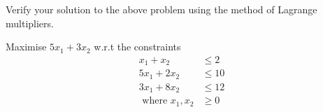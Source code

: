\documentclass[journal,12pt,twocolumn]{IEEEtran}
\begin{document}
\begin{problem}
	Verify your solution to the above problem using the method of Lagrange multipliers.
\end{problem}
%
\begin{problem}
	 Maximise $5x_1 + 3x_2$ w.r.t the constraints
	 \begin{align}
	 x_1 + x_2 &\leq 2 \nonumber\\
	 5x_1 + 2x_2 &\leq 10 \nonumber\\
	 3x_1 + 8x_2 &\leq 12 \nonumber\\
	 \text{ where } x_1,x_2 &\geq 0 \nonumber
	 \end{align}	
\end{problem}
\end{document}
